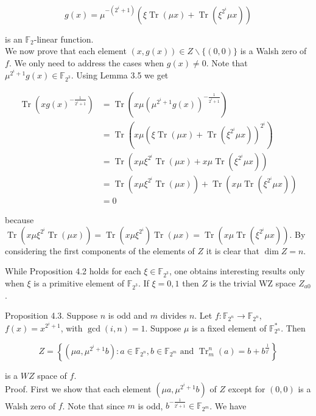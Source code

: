 \documentclass[10pt]{article}
\begin{document}
$$
g(x)=\mu^{-\left(2^{i}+1\right)}\left(\xi \operatorname{Tr}(\mu x)+\operatorname{Tr}\left(\xi^{2^{i}} \mu x\right)\right)
$$

is an $\mathbb{F}_{2}$-linear function.\\
We now prove that each element $(x, g(x)) \in Z \backslash\{(0,0)\}$ is a Walsh zero of $f$. We only need to address the cases when $g(x) \neq 0$. Note that $\mu^{2^{i}+1} g(x) \in \mathbb{F}_{2^{3}}$. Using Lemma 3.5 we get

$$
\begin{aligned}
\operatorname{Tr}\left(x g(x)^{-\frac{1}{2^{i}+1}}\right) & =\operatorname{Tr}\left(x \mu\left(\mu^{2^{i}+1} g(x)\right)^{-\frac{1}{2^{i}+1}}\right) \\
& =\operatorname{Tr}\left(x \mu\left(\xi \operatorname{Tr}(\mu x)+\operatorname{Tr}\left(\xi^{2^{i}} \mu x\right)\right)^{2^{i}}\right) \\
& =\operatorname{Tr}\left(x \mu \xi^{2^{i}} \operatorname{Tr}(\mu x)+x \mu \operatorname{Tr}\left(\xi^{2^{i}} \mu x\right)\right) \\
& =\operatorname{Tr}\left(x \mu \xi^{2^{i}} \operatorname{Tr}(\mu x)\right)+\operatorname{Tr}\left(x \mu \operatorname{Tr}\left(\xi^{2^{i}} \mu x\right)\right) \\
& =0
\end{aligned}
$$

because $\operatorname{Tr}\left(x \mu \xi^{2^{i}} \operatorname{Tr}(\mu x)\right)=\operatorname{Tr}\left(x \mu \xi^{2^{i}}\right) \operatorname{Tr}(\mu x)=\operatorname{Tr}\left(x \mu \operatorname{Tr}\left(\xi^{2^{i}} \mu x\right)\right)$. By considering the first components of the elements of $Z$ it is clear that $\operatorname{dim} Z= n$.

While Proposition 4.2 holds for each $\xi \in \mathbb{F}_{2^{3}}$, one obtains interesting results only when $\xi$ is a primitive element of $\mathbb{F}_{2^{3}}$. If $\xi=0,1$ then $Z$ is the trivial WZ space $Z_{a 0}$.

Proposition 4.3. Suppose $n$ is odd and $m$ divides $n$. Let $f: \mathbb{F}_{2^{n}} \rightarrow \mathbb{F}_{2^{n}}$, $f(x)=x^{2^{i}+1}$, with $\operatorname{gcd}(i, n)=1$. Suppose $\mu$ is a fixed element of $\mathbb{F}_{2^{n}}^{*}$. Then

$$
Z=\left\{\left(\mu a, \mu^{2^{i}+1} b\right): a \in \mathbb{F}_{2^{n}}, b \in \mathbb{F}_{2^{m}} \text { and } \operatorname{Tr}_{m}^{n}(a)=b+b^{\frac{1}{2^{i}}}\right\}
$$

is a $W Z$ space of $f$.\\
Proof. First we show that each element $\left(\mu a, \mu^{2^{i}+1} b\right)$ of $Z$ except for $(0,0)$ is a Walsh zero of $f$. Note that since $m$ is odd, $b^{-\frac{1}{2^{i}+1}} \in \mathbb{F}_{2^{m}}$. We have
\end{document}
